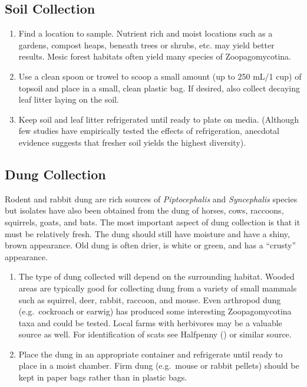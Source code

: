 \documentclass[]{book}
\begin{document}
\hypertarget{soil-collection}{%
\subsection{Soil Collection}\label{soil-collection}}

\begin{enumerate}
\def\labelenumi{\arabic{enumi}.}
\item
  Find a location to sample. Nutrient rich and moist locations such as a gardens, compost heaps, beneath trees or shrubs, etc. may yield better results. Mesic forest habitats often yield many species of Zoopagomycotina.
\item
  Use a clean spoon or trowel to scoop a small amount (up to 250 mL/1 cup) of topsoil and place in a small, clean plastic bag. If desired, also collect decaying leaf litter laying on the soil.
\item
  Keep soil and leaf litter refrigerated until ready to plate on media. (Although few studies have empirically tested the effects of refrigeration, anecdotal evidence suggests that fresher soil yields the highest diversity).
\end{enumerate}

\hypertarget{dung-collection}{%
\subsection{Dung Collection}\label{dung-collection}}

Rodent and rabbit dung are rich sources of \emph{Piptocephalis} and \emph{Syncephalis} species but isolates have also been obtained from the dung of horses, cows, raccoons, squirrels, goats, and bats. The most important aspect of dung collection is that it must be relatively fresh. The dung should still have moisture and have a shiny, brown appearance. Old dung is often drier, is white or green, and has a ``crusty'' appearance.

\begin{enumerate}
\def\labelenumi{\arabic{enumi}.}
\item
  The type of dung collected will depend on the surrounding habitat. Wooded areas are typically good for collecting dung from a variety of small mammals such as squirrel, deer, rabbit, raccoon, and mouse. Even arthropod dung (e.g.~cockroach or earwig) has produced some interesting Zoopagomycotina taxa and could be tested. Local farms with herbivores may be a valuable source as well. For identification of scats see Halfpenny (\citeyearpar{Halfpenny_2008}) or similar source.
\item
  Place the dung in an appropriate container and refrigerate until ready to place in a moist chamber. Firm dung (e.g.~mouse or rabbit pellets) should be kept in paper bags rather than in plastic bags.
\end{enumerate}
\end{document}
